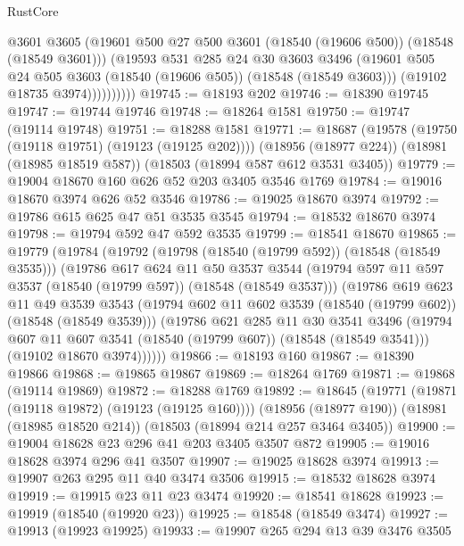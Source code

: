 \begin{lexlean}{RustCore}
\begin{coremodule}
                    @3601
                    @3605
                    (@19601 @500 @27 @500 @3601 (@18540 (@19606 @500)) (@18548 (@18549 @3601)))
                    (@19593
                      @531
                      @285
                      @24
                      @30
                      @3603
                      @3496
                      (@19601 @505 @24 @505 @3603 (@18540 (@19606 @505)) (@18548 (@18549 @3603)))
                      (@19102 @18735 @3974))))))))))
@19745 := @18193 @202
@19746 := @18390 @19745
@19747 := @19744 @19746
@19748 := @18264 @1581
@19750 := @19747 (@19114 @19748)
@19751 := @18288 @1581
@19771 := @18687
    (@19578 (@19750 (@19118 @19751) (@19123 (@19125 @202))))
    (@18956 (@18977 @224))
    (@18981 (@18985 @18519 @587))
    (@18503 (@18994 @587 @612 @3531 @3405))
@19779 := @19004 @18670 @160 @626 @52 @203 @3405 @3546 @1769
@19784 := @19016 @18670 @3974 @626 @52 @3546
@19786 := @19025 @18670 @3974
@19792 := @19786 @615 @625 @47 @51 @3535 @3545
@19794 := @18532 @18670 @3974
@19798 := @19794 @592 @47 @592 @3535
@19799 := @18541 @18670
@19865 := @19779
    (@19784
      (@19792
        (@19798 (@18540 (@19799 @592)) (@18548 (@18549 @3535)))
        (@19786
          @617
          @624
          @11
          @50
          @3537
          @3544
          (@19794 @597 @11 @597 @3537 (@18540 (@19799 @597)) (@18548 (@18549 @3537)))
          (@19786
            @619
            @623
            @11
            @49
            @3539
            @3543
            (@19794 @602 @11 @602 @3539 (@18540 (@19799 @602)) (@18548 (@18549 @3539)))
            (@19786
              @621
              @285
              @11
              @30
              @3541
              @3496
              (@19794 @607 @11 @607 @3541 (@18540 (@19799 @607)) (@18548 (@18549 @3541)))
              (@19102 @18670 @3974))))))
@19866 := @18193 @160
@19867 := @18390 @19866
@19868 := @19865 @19867
@19869 := @18264 @1769
@19871 := @19868 (@19114 @19869)
@19872 := @18288 @1769
@19892 := @18645
    (@19771 (@19871 (@19118 @19872) (@19123 (@19125 @160))))
    (@18956 (@18977 @190))
    (@18981 (@18985 @18520 @214))
    (@18503 (@18994 @214 @257 @3464 @3405))
@19900 := @19004 @18628 @23 @296 @41 @203 @3405 @3507 @872
@19905 := @19016 @18628 @3974 @296 @41 @3507
@19907 := @19025 @18628 @3974
@19913 := @19907 @263 @295 @11 @40 @3474 @3506
@19915 := @18532 @18628 @3974
@19919 := @19915 @23 @11 @23 @3474
@19920 := @18541 @18628
@19923 := @19919 (@18540 (@19920 @23))
@19925 := @18548 (@18549 @3474)
@19927 := @19913 (@19923 @19925)
@19933 := @19907 @265 @294 @13 @39 @3476 @3505

\end{coremodule}
\end{lexlean}
